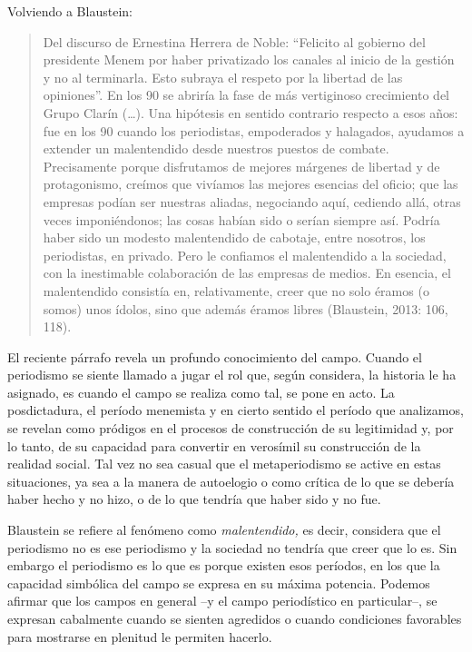 {Volviendo a Blaustein:

\begin{quote}
Del discurso de Ernestina Herrera de Noble: ``Felicito al gobierno del presidente Menem por haber privatizado los canales al inicio de la gestión y no al terminarla. Esto subraya el respeto por la libertad de las opiniones''. En los 90 se abriría la fase de más vertiginoso crecimiento del Grupo Clarín (\ldots). Una hipótesis en sentido contrario respecto a esos años: fue en los 90 cuando los periodistas, empoderados y halagados, ayudamos a extender un malentendido desde nuestros puestos de combate. Precisamente porque disfrutamos de mejores márgenes de libertad y de protagonismo, creímos que vivíamos las mejores esencias del oficio; que las empresas podían ser nuestras aliadas, negociando aquí, cediendo allá, otras veces imponiéndonos; las cosas habían sido o serían siempre así. Podría haber sido un modesto malentendido de cabotaje, entre nosotros, los periodistas, en privado. Pero le confiamos el malentendido a la sociedad, con la inestimable colaboración de las empresas de medios. En esencia, el malentendido consistía en, relativamente, creer que no solo éramos (o somos) unos ídolos, sino que además éramos libres (Blaustein, 2013: 106, 118).
\end{quote}

El reciente párrafo revela un profundo conocimiento del campo. Cuando el periodismo se siente llamado a jugar el rol que, según considera, la historia le ha asignado, es cuando el campo se realiza como tal, se pone en acto. La posdictadura, el período menemista y en cierto sentido el período que analizamos, se revelan como pródigos en el procesos de construcción de su legitimidad y, por lo tanto, de su capacidad para convertir en verosímil su construcción de la realidad social. Tal vez no sea casual que el metaperiodismo se active en estas situaciones, ya sea a la manera de autoelogio o como crítica de lo que se debería haber hecho y no hizo, o de lo que tendría que haber sido y no fue.

Blaustein se refiere al fenómeno como \emph{malentendido,} es decir, considera que el periodismo no es ese periodismo y la sociedad no tendría que creer que lo es. Sin embargo el periodismo es lo que es porque existen esos períodos, en los que la capacidad simbólica del campo se expresa en su máxima potencia. Podemos afirmar que los campos en general --y el campo periodístico en particular--, se expresan cabalmente cuando se sienten agredidos o cuando condiciones favorables para mostrarse en plenitud le permiten hacerlo.

}
